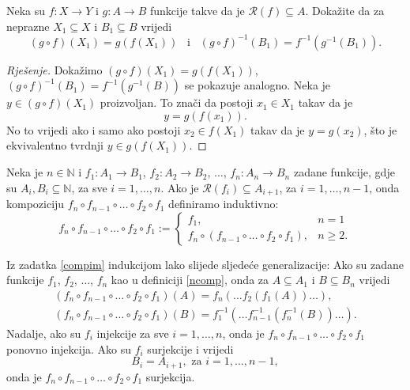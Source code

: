 \begin{exercise}
\label{compim}
Neka su $f : X\to Y$ i $g : A\to B$ funkcije takve da je $\mathcal{R}(f)\subseteq A$. Dokažite da za neprazne $X_1\subseteq X$ i $B_1\subseteq B$ vrijedi $$(g\circ f)(X_1)=g(f(X_1))\;\;\;\text{i}\;\;\;(g\circ f)^{-1}(B_1)=f^{-1}(g^{-1}(B_1)).$$
\end{exercise}
\begin{proof}[Rješenje]
Dokažimo $(g\circ f)(X_1)=g(f(X_1))$, $(g\circ f)^{-1}(B_1)=f^{-1}(g^{-1}(B))$ se pokazuje analogno. Neka je $y\in (g\circ f)(X_1)$ proizvoljan. To znači da postoji $x_1\in X_1$ takav da je $$y=g\left(f(x_1)\right).$$
No to vrijedi ako i samo ako postoji $x_2\in f(X_1)$ takav da je $y=g(x_2)$, što je ekvivalentno tvrdnji $y\in g(f(X_1))$.
\end{proof}
\begin{definition}
\label{ncomp}
Neka je $n\in \mathbb{N}$ i $f_1 : A_1\to B_1$, $f_2 : A_2\to B_2$, $\dots$, $f_n : A_n\to B_n$ zadane funkcije, gdje su $A_i, B_i\subseteq \mathbb{N}$, za sve $i=1,\dots, n$. Ako je $\mathcal{R}(f_i)\subseteq A_{i+1}$, za $i=1,\dots, n-1$, onda kompoziciju $f_n\circ f_{n-1}\circ \dots \circ f_2\circ f_1$ definiramo induktivno:
$$f_n\circ f_{n-1}\circ \dots \circ f_2\circ f_1:=\begin{cases}
f_1, & n=1\\
f_n\circ (f_{n-1}\circ \dots \circ f_2\circ f_1),& n\geq 2.
\end{cases}
$$
\end{definition}
\begin{remark}
\label{ncomprem}
Iz zadatka \ref{compim} indukcijom lako slijede sljedeće generalizacije: Ako su zadane funkcije $f_1$, $f_2$, $\dots$, $f_n$ kao u definiciji \ref{ncomp}, onda za $A\subseteq A_1$ i $B\subseteq B_n$ vrijedi
\begin{gather*}
(f_n\circ f_{n-1}\circ\dots\circ f_2\circ f_1)(A)=f_n(\dots f_2(f_1(A))\dots),\\
(f_n\circ f_{n-1}\circ\dots\circ f_2\circ f_1)(B)=f_1^{-1}(\dots f_{n-1}^{-1}(f_n^{-1}(B))\dots).
\end{gather*}
Nadalje, ako su $f_i$ injekcije za sve $i=1, \dots, n$, onda je $f_n\circ f_{n-1}\circ\dots\circ f_2\circ f_1$ ponovno injekcija. Ako su $f_i$ surjekcije i vrijedi
$$B_i=A_{i+1},\text{ za }i=1,\dots, n-1,$$
onda je $f_n\circ f_{n-1}\circ\dots\circ f_2\circ f_1$ surjekcija.
\end{remark}

